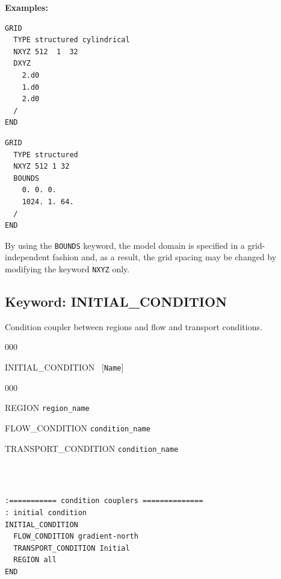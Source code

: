 \documentclass[12pt]{article}
\begin{document}
\begin{mdframed}

\noindent
{\bf Examples:}
\begin{verbatim}
GRID
  TYPE structured cylindrical
  NXYZ 512  1  32
  DXYZ
    2.d0
    1.d0
    2.d0
  /
END
\end{verbatim}

\begin{verbatim}
GRID
  TYPE structured
  NXYZ 512 1 32
  BOUNDS
    0. 0. 0.
    1024. 1. 64.
  /
END
\end{verbatim}
\end{mdframed}

\noindent
By using the {\tt BOUNDS} keyword, the model domain is specified in a grid-independent fashion and, as a result, the grid spacing may be changed by modifying the keyword {\tt NXYZ} only.

\hyperlink{target_key}{\return}

\hyperlink{target_input_file}{\returnb}


\newpage
\protect\hypertarget{target_init}{}

\subsection{Keyword: INITIAL\_CONDITION}

 Condition coupler between regions and flow and transport conditions.

\begin{deflist}{000}
\item[INITIAL\_CONDITION] \ [{\tt Name}]
\begin{deflist}{000}
\item[REGION] {\tt region\_name}
\item[FLOW\_CONDITION] {\tt condition\_name}
\item[TRANSPORT\_CONDITION] {\tt condition\_name}
\end{deflist}
\item[\keyend] ~
\end{deflist}


\begin{mdframed}


\begin{verbatim}

:=========== condition couplers ==============
: initial condition
INITIAL_CONDITION
  FLOW_CONDITION gradient-north
  TRANSPORT_CONDITION Initial
  REGION all
END
\end{verbatim}
\end{mdframed}
\end{document}
